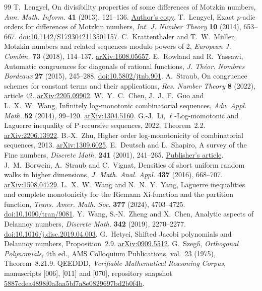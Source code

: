 \documentclass[11pt,a4paper]{article}
\begin{document}
\begin{thebibliography}{99}\small
{} T.~Lengyel, On divisibility properties of some differences of Motzkin numbers, \emph{Ann. Math. Inform.} \textbf{41} (2013), 121--136. \href{https://sites.oxy.edu/lengyel/papers/AMI_41_from121to136.pdf}{Author's copy}.
 T.~Lengyel, Exact $p$-adic orders for differences of Motzkin numbers, \emph{Int. J. Number Theory} \textbf{10} (2014), 653--667. \href{https://doi.org/10.1142/S1793042113501157}{doi:10.1142/S1793042113501157}.
 C.~Krattenthaler and T.~W.~M\"uller, Motzkin numbers and related sequences modulo powers of 2, \emph{European J. Combin.} \textbf{73} (2018), 114--137. \href{https://arxiv.org/abs/1608.05657}{arXiv:1608.05657}.
 E.~Rowland and R.~Yassawi, Automatic congruences for diagonals of rational functions, \emph{J. Th\'eor. Nombres Bordeaux} \textbf{27} (2015), 245--288. \href{https://doi.org/10.5802/jtnb.901}{doi:10.5802/jtnb.901}.
 A.~Straub, On congruence schemes for constant terms and their applications, \emph{Res. Number Theory} \textbf{8} (2022), article 42. \href{https://arxiv.org/abs/2205.09902}{arXiv:2205.09902}.
 W.~Y.~C.~Chen, J.~J.~F.~Guo and L.~X.~W.~Wang, Infinitely log-monotonic combinatorial sequences, \emph{Adv. Appl. Math.} \textbf{52} (2014), 99--120. \href{https://arxiv.org/abs/1304.5160}{arXiv:1304.5160}.
 G.-J.~Li, $\ell$-Log-momotonic and Laguerre inequality of P-recursive sequences, 2022, Theorem~2.2. \href{https://arxiv.org/abs/2206.13922}{arXiv:2206.13922}.
 B.-X.~Zhu, Higher order log-monotonicity of combinatorial sequences, 2013. \href{https://arxiv.org/abs/1309.6025}{arXiv:1309.6025}.
 E.~Deutsch and L.~Shapiro, A survey of the Fine numbers, \emph{Discrete Math.} \textbf{241} (2001), 241--265. \href{https://www.sciencedirect.com/science/article/pii/S0012365X01001212}{Publisher's article}.
 J.~M.~Borwein, A.~Straub and C.~Vignat, Densities of short uniform random walks in higher dimensions, \emph{J. Math. Anal. Appl.} \textbf{437} (2016), 668--707. \href{https://arxiv.org/abs/1508.04729}{arXiv:1508.04729}.
 L.~X.~W.~Wang and N.~N.~Y.~Yang, Laguerre inequalities and complete monotonicity for the Riemann Xi-function and the partition function, \emph{Trans. Amer. Math. Soc.} \textbf{377} (2024), 4703--4725. \href{https://doi.org/10.1090/tran/9081}{doi:10.1090/tran/9081}.
 Y.~Wang, S.-N.~Zheng and X.~Chen, Analytic aspects of Delannoy numbers, \emph{Discrete Math.} \textbf{342} (2019), 2270--2277. \href{https://doi.org/10.1016/j.disc.2019.04.003}{doi:10.1016/j.disc.2019.04.003}.
 G.~Hetyei, Shifted Jacobi polynomials and Delannoy numbers, Proposition~2.9. \href{https://arxiv.org/abs/0909.5512}{arXiv:0909.5512}.
 G.~Szeg\H{o}, \emph{Orthogonal Polynomials}, 4th ed., AMS Colloquium Publications, vol.~23 (1975), Theorem~8.21.9.
 QEEDDD, \emph{Verifiable Mathematical Reasoning Corpus}, manuscripts [006], [011] and [070], repository snapshot
\href{https://github.com/QEEDDD/Verifiable-Mathematical-Reasoning-Corpus/tree/5887cdea4898f0a3aa5bf7a8e0829697bd2b0f4b}{5887cdea4898f0a3aa5bf7a8e0829697bd2b0f4b}.
\end{thebibliography}
\end{document}

